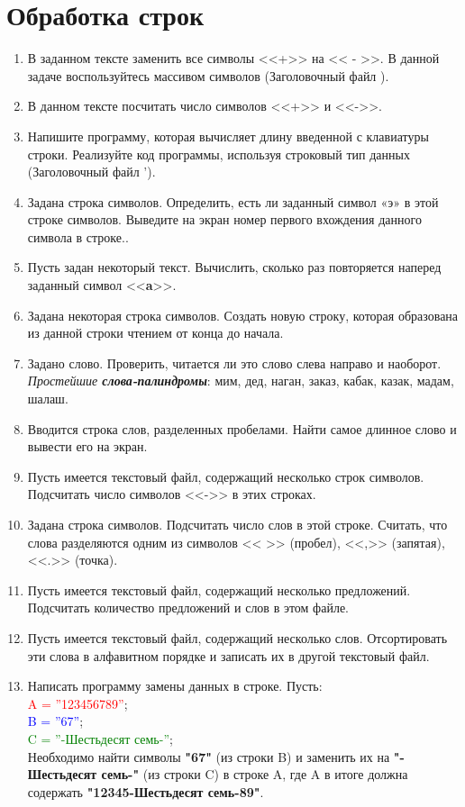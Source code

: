 \chapter{Обработка строк}
\begin{enumerate}[leftmargin=*]
    \item В заданном тексте заменить все символы <<+>> на << - >>. В данной задаче воспользуйтесь массивом символов (Заголовочный файл ).
    \item В данном тексте посчитать число символов <<+>> и <<->>.
    \item Напишите программу, которая вычисляет длину введенной с клавиатуры строки. Реализуйте код программы, используя строковый тип данных (Заголовочный файл ').
    \item Задана строка символов. Определить, есть ли заданный символ «э» в этой строке символов. Выведите на экран номер первого вхождения данного символа в строке..
    \item Пусть задан некоторый текст. Вычислить, сколько раз повторяется наперед заданный символ <<\textbf{a}>>.
    \item Задана некоторая строка символов. Создать новую строку, которая образована из данной строки чтением от конца до начала.
    \item Задано слово. Проверить, читается ли это слово слева направо и наоборот. \textit{Простейшие \textbf{слова-палиндромы}}: мим, дед, наган, заказ, кабак, казак, мадам, шалаш.
    \item Вводится строка слов, разделенных пробелами. Найти самое длинное слово и вывести его на экран. 
    \item Пусть имеется текстовый файл, содержащий несколько строк символов. Подсчитать число символов <<->> в этих строках.
    \item Задана строка символов. Подсчитать число слов в этой строке. Считать, что слова разделяются одним из символов << >> (пробел), <<,>> (запятая), <<.>> (точка).
    \item Пусть имеется текстовый файл, содержащий несколько предложений. Подсчитать количество предложений и слов в этом файле.
    \item Пусть имеется текстовый файл, содержащий несколько слов. Отсортировать эти слова в алфавитном порядке и записать их в другой текстовый файл.
    \item Написать программу замены данных в строке. Пусть:\\ \textcolor{Red}{A = ''123456789''};\\
    \textcolor{Blue}{B = ''67''};\\
    \textcolor{Green}{C = ''-Шестьдесят семь-''};\\
    Необходимо найти символы \textbf{"67"} (из строки B) и заменить их на \textbf{"-Шестьдесят семь-"} (из строки C) в строке A, где A в итоге должна содержать \textbf{"12345-Шестьдесят семь-89"}.
\end{enumerate}
